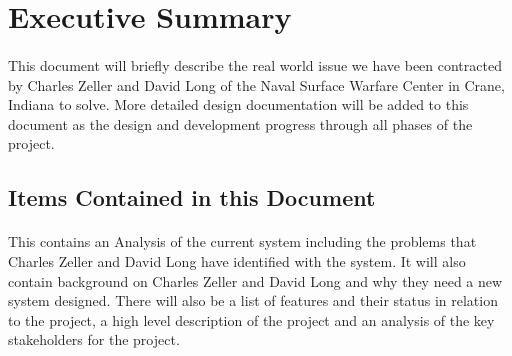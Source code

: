 \section{Executive Summary}
\paragraph{} This document will briefly describe the real world issue we have been contracted by Charles Zeller and David Long of the Naval Surface Warfare Center in Crane, Indiana to solve. More detailed design documentation will be added to this document as the design and development progress through all phases of the project.

\subsection*{Items Contained in this Document}
\paragraph{}This contains an Analysis of the current system including the problems that Charles Zeller and David Long have identified with the system. It will also contain background on Charles Zeller and David Long and why they need a new system designed. There will also be a list of features and their status in relation to the project, a high level description of the project and an analysis of the key stakeholders for the project. %
